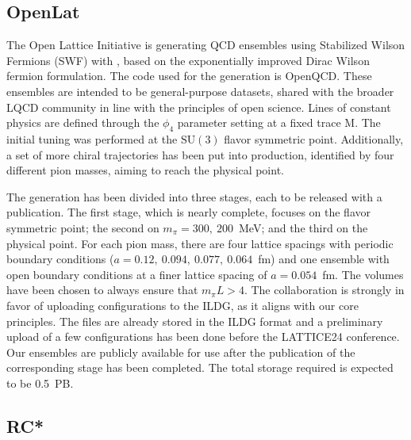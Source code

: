 \documentclass[a4paper,11pt]{article}
\begin{document}
\subsection{OpenLat}
The Open Lattice Initiative is generating QCD ensembles using
Stabilized Wilson Fermions (SWF) with \cite{Francis:2022hyr},
based on the exponentially improved Dirac Wilson fermion formulation.
The code used for the generation is OpenQCD\cite{openqcd}.  These
ensembles are intended to be general-purpose datasets, shared with the
broader LQCD community in line with the principles of open
science. Lines of constant physics are defined through the $\phi_4$
parameter setting at a fixed trace M. The initial tuning was performed
at the $\mathrm{SU}(3)$ flavor symmetric point.  Additionally, a set
of more chiral trajectories has been put into production, identified
by four different pion masses, aiming to reach the physical point.

The generation has been divided into three stages, each to be released
with a publication. The first stage, which is nearly complete, focuses
on the flavor symmetric point; the second on $m_\pi=300,~200$~MeV; and
the third on the physical point. For each pion mass, there are four
lattice spacings with periodic boundary conditions
($a=0.12,~0.094,~0.077,~0.064$~fm) and one ensemble with open boundary
conditions at a finer lattice spacing of $a=0.054$~fm.  The volumes
have been chosen to always ensure that $m_\pi L > 4$.  The
collaboration is strongly in favor of uploading configurations to the
ILDG, as it aligns with our core principles. The files are already
stored in the ILDG format and a preliminary upload of a few
configurations has been done before the LATTICE24 conference. Our
ensembles are publicly available for use after the publication of the
corresponding stage has been completed. The total storage required is
expected to be 0.5~PB.

\newpage
\subsection{RC*}
\end{document}
